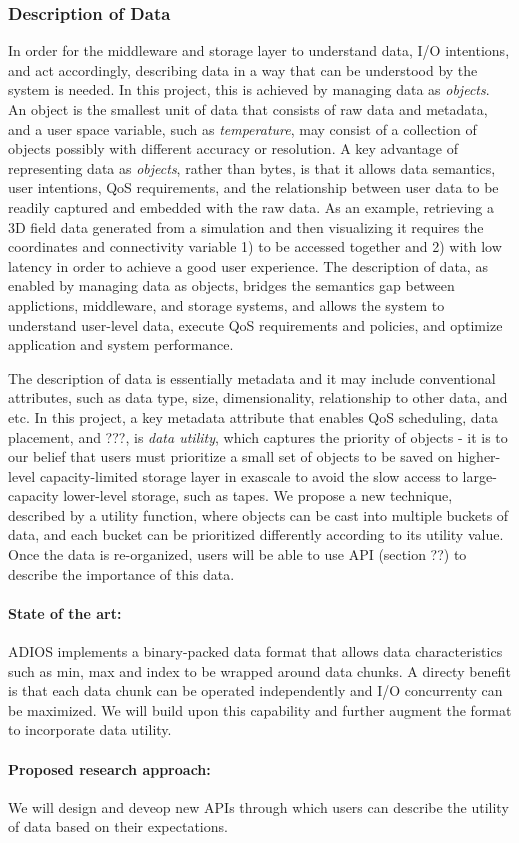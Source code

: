 \subsubsection{Description of Data}
In order for the middleware and storage layer to understand data,
I/O intentions, and act accordingly, describing data in a way that can
be understood by the system is needed. In this project, this is achieved 
by managing data as \textit{objects}.
An object is the smallest unit of data that consists of raw data and metadata,
and a user space variable, such as \textit{temperature}, may consist of a collection
of objects possibly with different accuracy or resolution.
A key advantage of representing data as \textit{objects}, rather than 
bytes, is that it allows data semantics, user intentions, QoS requirements, and
the relationship between user data to be readily captured and embedded with the 
raw data. As an example, retrieving a 3D field data generated from a simulation and then visualizing it
requires the coordinates and connectivity variable 1) to be accessed together and 2) with low
latency in order to achieve a good user experience. The description of data, 
as enabled by managing data as objects, bridges 
the semantics gap between applictions, middleware, and storage systems,
and allows the system to understand user-level data, execute QoS requirements and policies, and
optimize application and system performance.

The description of data is essentially metadata and it may include conventional attributes, such as 
data type, size, dimensionality, relationship to other data, and etc. In this project, a key metadata attribute
that enables QoS scheduling, data placement, and ???, is \textit{data utility}, which
captures the priority of objects - it is to our belief that
users must prioritize a small set of objects to be saved on 
higher-level capacity-limited storage layer in exascale
to avoid the slow access to large-capacity lower-level storage, such as tapes.
We propose a new technique, described by a utility function, where objects
can be cast into multiple buckets of data, and each bucket can be prioritized differently according
to its utility value.
Once the data is re-organized, users will be able to use API (section ??)
to describe the importance of this data.

\paragraph{State of the art:} ADIOS implements a binary-packed data format that allows
data characteristics such as min, max and index to be wrapped around data chunks. A
directy benefit is that each data chunk can be operated independently and I/O concurrenty
can be maximized. We will build upon this capability and further augment the format
to incorporate data utility. 

\paragraph{Proposed research approach:} 
We will design and deveop new APIs through which users can describe the utility of data
based on their expectations.
